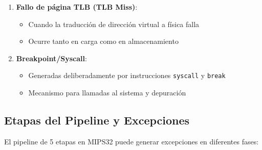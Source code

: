 \documentclass{article}
\begin{document}
\begin{enumerate}
    \item \textbf{Fallo de página TLB (TLB Miss)}:
    \begin{itemize}
        \item Cuando la traducción de dirección virtual a física falla
        \item Ocurre tanto en carga como en almacenamiento
    \end{itemize}

    \item \textbf{Breakpoint/Syscall}:
    \begin{itemize}
        \item Generadas deliberadamente por instrucciones \texttt{syscall} y \texttt{break}
        \item Mecanismo para llamadas al sistema y depuración
    \end{itemize}
\end{enumerate}

\subsection{Etapas del Pipeline y Excepciones}

El pipeline de 5 etapas en MIPS32 puede generar excepciones en diferentes fases:
\end{document}
